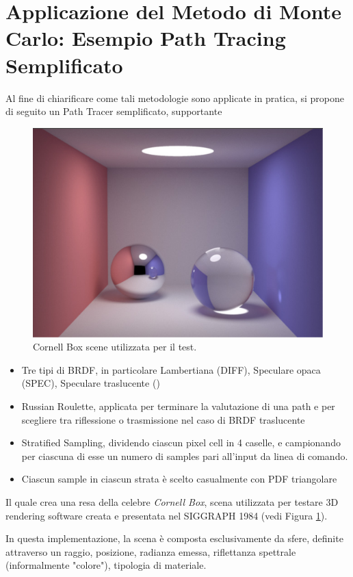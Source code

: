\section{Applicazione del Metodo di Monte Carlo: Esempio Path Tracing Semplificato}
Al fine di chiarificare come tali metodologie sono applicate in pratica, si propone di seguito un Path Tracer semplificato, supportante
\begin{figure}[tb]
	\centering
	\includegraphics[width=0.7\linewidth]{../assets/chapter8_MCRendering_reference.png}
	\caption{Cornell Box scene utilizzata per il test.}
	\label{chapter8:MCRendering:reference}
\end{figure}
\begin{itemize}[topsep=0pt,noitemsep]
	\item Tre tipi di BRDF, in particolare Lambertiana (\textrm{DIFF}), Speculare opaca (\textrm{SPEC}), Speculare traslucente (\textrm{}) 
	\item Russian Roulette, applicata per terminare la valutazione di una path e per scegliere tra riflessione o trasmissione nel caso di 
		BRDF traslucente
	\item Stratified Sampling, dividendo ciascun pixel cell in 4 caselle, e campionando per ciascuna di esse un numero di samples pari all'input da 
		linea di comando. 
	\item Ciascun sample in ciascun strata \`e scelto casualmente con PDF triangolare
\end{itemize}
Il quale crea una resa della celebre \textit{Cornell Box}, scena utilizzata per testare 3D rendering software creata e presentata nel SIGGRAPH 1984
(vedi Figura \ref{chapter8:MCRendering:reference}).\par
In questa implementazione, la scena \`e composta esclusivamente da sfere, definite attraverso un raggio, posizione, radianza emessa, 
riflettanza spettrale (informalmente "colore"), tipologia di materiale.
